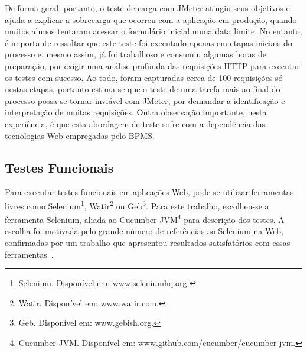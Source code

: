 \documentclass[12pt]{article}
\begin{document}

De forma geral, portanto, o teste de carga com JMeter atingiu seus objetivos e ajuda a explicar a sobrecarga que ocorreu com a aplicação em produção, quando muitos alunos tentaram acessar o formulário inicial numa data limite. No entanto, é importante ressaltar que este teste foi executado apenas em etapas iniciais do processo e, mesmo assim, já foi trabalhoso e consumiu algumas horas de preparação, por exigir uma análise profunda das requisições HTTP para executar os testes com sucesso. Ao todo, foram capturadas cerca de 100 requisições só nestas etapas, portanto estima-se que o teste de uma tarefa mais ao final do processo possa se tornar inviável com JMeter, por demandar a identificação e interpretação de muitas requisições. Outra observação importante, nesta experiência, é que esta abordagem de teste sofre com a dependência das tecnologias Web empregadas pelo BPMS.



\subsection{Testes Funcionais}

Para executar testes funcionais em aplicações Web, pode-se utilizar ferramentas livres como Selenium\footnote{Selenium. Disponível em: www.seleniumhq.org.}, Watir\footnote{Watir. Disponível em: www.watir.com.} ou Geb\footnote{Geb. Disponível em: www.gebish.org.}. Para este trabalho, escolheu-se a ferramenta Selenium, aliada ao Cucumber-JVM\footnote{Cucumber-JVM. Disponível em: www.github.com/cucumber/cucumber-jvm.} para descrição dos testes. A escolha foi motivada pelo grande número de referências ao Selenium na Web, confirmadas por um trabalho que apresentou resultados satisfatórios com essas ferramentas~\cite{sbqs2013}.
\end{document}
